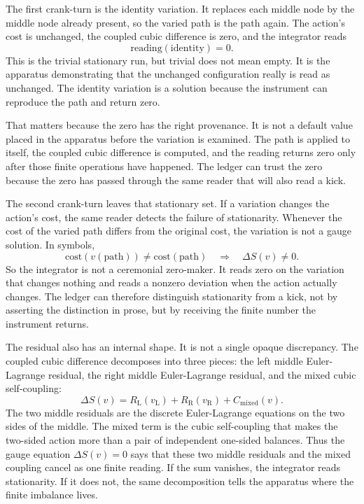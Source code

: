 The first crank-turn is the identity variation. It replaces each middle node by
the middle node already present, so the varied path is the path again. The
action's cost is unchanged, the coupled cubic difference is zero, and the
integrator reads
\[
  \mathrm{reading}(\mathrm{identity}) = 0.
\]
This is the trivial stationary run, but trivial does not mean empty. It is the
apparatus demonstrating that the unchanged configuration really is read as
unchanged. The identity variation is a solution because the instrument can
reproduce the path and return zero.

That matters because the zero has the right provenance. It is not a default
value placed in the apparatus before the variation is examined. The path is
applied to itself, the coupled cubic difference is computed, and the reading
returns zero only after those finite operations have happened. The ledger can
trust the zero because the zero has passed through the same reader that will
also read a kick.

The second crank-turn leaves that stationary set. If a variation changes the
action's cost, the same reader detects the failure of stationarity. Whenever the
cost of the varied path differs from the original cost, the variation is not a
gauge solution. In symbols,
\[
  \mathrm{cost}(v(\mathrm{path}))\neq \mathrm{cost}(\mathrm{path})
  \quad\Longrightarrow\quad
  \Delta S(v)\neq 0.
\]
So the integrator is not a ceremonial zero-maker. It reads zero on the variation
that changes nothing and reads a nonzero deviation when the action actually
changes. The ledger can therefore distinguish stationarity from a kick, not by
asserting the distinction in prose, but by receiving the finite number the
instrument returns.

The residual also has an internal shape. It is not a single opaque discrepancy.
The coupled cubic difference decomposes into three pieces: the left middle
Euler-Lagrange residual, the right middle Euler-Lagrange residual, and the
mixed cubic self-coupling:
\[
  \Delta S(v)
  =
  R_{\mathrm{L}}(v_{\mathrm{L}})
  + R_{\mathrm{R}}(v_{\mathrm{R}})
  + C_{\mathrm{mixed}}(v).
\]
The two middle residuals are the discrete Euler-Lagrange equations on the two
sides of the middle. The mixed term is the cubic self-coupling that makes the
two-sided action more than a pair of independent one-sided balances. Thus the
gauge equation \(\Delta S(v)=0\) says that these two middle residuals and the
mixed coupling cancel as one finite reading. If the sum vanishes, the integrator
reads stationarity. If it does not, the same decomposition tells the apparatus
where the finite imbalance lives.

